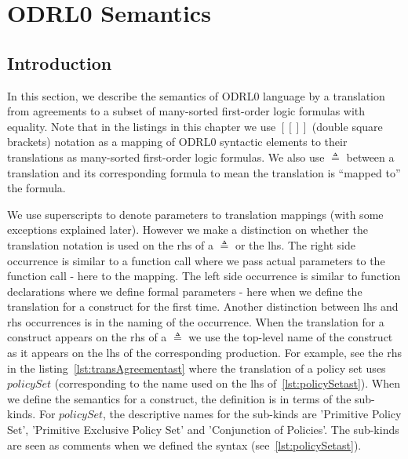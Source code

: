 \chapter{ODRL0 Semantics}\label{chap:semantics}

                  
\section{Introduction}\label{sec:introsemantics}


In this section, we describe the semantics of ODRL0 language by a translation from agreements to a subset of many-sorted first-order logic formulas with equality. Note that in the listings in this chapter we use $[\![]\!]$ (double square brackets) notation as a mapping of ODRL0 syntactic elements to their translations as many-sorted first-order logic formulas. We also use $\triangleq$ between a translation and its corresponding formula to mean the translation is ``mapped to'' the formula. 

We use superscripts to denote parameters to translation mappings (with some exceptions explained later). However we make a distinction on whether the translation notation is used on the \ac{rhs} of a $\triangleq$ or the \ac{lhs}. The right side occurrence is similar to a function call where we pass actual parameters to the function call - here to the mapping. The left side occurrence is similar to function declarations where we define formal parameters - here when we define the translation for a construct for the first time. Another distinction between \ac{lhs} and \ac{rhs} occurrences is in the naming of the occurrence. When the translation for a construct appears on the \ac{rhs} of a $\triangleq$ we use the top-level name of the construct as it appears on the \ac{lhs} of the corresponding production. For example, see the \ac{rhs} in the listing~\ref{lst:transAgreementast} where the translation of a policy set uses $policySet$ (corresponding to the name used on the \ac{lhs} of~\ref{lst:policySetast}). When we define the semantics for a construct, the definition is in terms of the sub-kinds. For $policySet$, the descriptive names for the sub-kinds are 'Primitive Policy Set', 'Primitive Exclusive Policy Set' and 'Conjunction of Policies'. The sub-kinds are seen as comments when we defined the syntax (see~\ref{lst:policySetast}).




